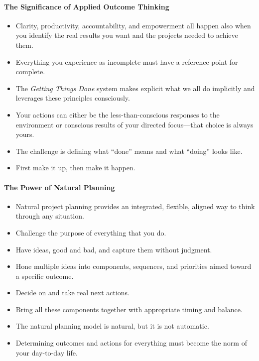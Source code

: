 \documentclass{article}
\begin{document}
\paragraph{The Significance of Applied Outcome Thinking}

\begin{itemize}
 \item Clarity, productivity, accountability, and empowerment all happen also when you identify the real results you want and the projects needed to achieve them.
 \item Everything you experience as incomplete must have a reference point for complete.
 \item The \textit{Getting Things Done} system makes explicit what we all do implicitly and leverages these principles consciously.
 \item Your actions can either be the less-than-conscious responses to the environment or conscious results of your directed focus---that choice is always yours.
 \item The challenge is defining what ``done'' means and what ``doing'' looks like.
 \item First make it up, then make it happen.
\end{itemize}

\paragraph{The Power of Natural Planning}

\begin{itemize}
 \item Natural project planning provides an integrated, flexible, aligned way to think through any situation.
 \item Challenge the purpose of everything that you do.
 \item Have ideas, good and bad, and capture them without judgment.
 \item Hone multiple ideas into components, sequences, and priorities aimed toward a specific outcome.
 \item Decide on and take real next actions.
 \item Bring all these components together with appropriate timing and balance.
 \item The natural planning model is natural, but it is not automatic.
 \item Determining outcomes and actions for everything must become the norm of your day-to-day life.
\end{itemize}
\end{document}

